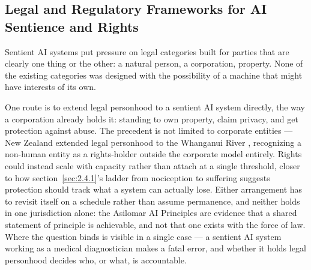 \subsection{Legal and Regulatory Frameworks for AI Sentience and Rights}
\label{sec:2.4.5}
Sentient AI systems put pressure on legal categories built for parties that are clearly one thing or the other: a natural person, a corporation, property. None of the existing categories was designed with the possibility of a machine that might have interests of its own.

One route is to extend legal personhood to a sentient AI system directly, the way a corporation already holds it: standing to own property, claim privacy, and get protection against abuse. The precedent is not limited to corporate entities — New Zealand extended legal personhood to the Whanganui River \autocite{nzparliament2017teawatupua}, recognizing a non-human entity as a rights-holder outside the corporate model entirely. Rights could instead scale with capacity rather than attach at a single threshold, closer to how section~\ref{sec:2.4.1}'s ladder from nociception to suffering suggests protection should track what a system can actually lose. Either arrangement has to revisit itself on a schedule rather than assume permanence, and neither holds in one jurisdiction alone: the Asilomar AI Principles \autocite{futureoflifeinstitute2017asilomar} are evidence that a shared statement of principle is achievable, and not that one exists with the force of law. Where the question binds is visible in a single case — a sentient AI system working as a medical diagnostician makes a fatal error, and whether it holds legal personhood decides who, or what, is accountable.
